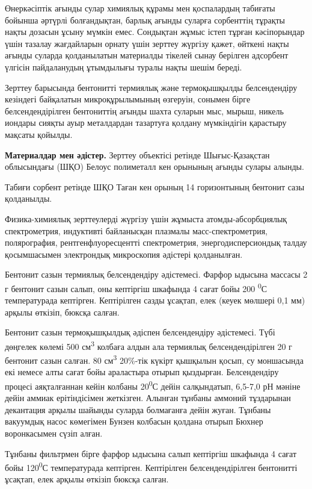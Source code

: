 Өнеркәсіптік ағынды сулар химиялық құрамы мен қоспалардың табиғаты
бойынша әртүрлі болғандықтан, барлық ағынды суларға сорбенттің тұрақты
нақты дозасын ұсыну мүмкін емес. Сондықтан жұмыс істеп тұрған
кәсіпорындар үшін тазалау жағдайларын орнату үшін зерттеу жүргізу қажет,
өйткені нақты ағынды суларда қолданылатын материалды тікелей сынау
берілген адсорбент үлгісін пайдаланудың ұтымдылығы туралы нақты шешім
береді.

Зерттеу барысында бентонитті термиялық және термоқышқылды белсендендіру
кезіндегі байқалатын микроқұрылымының өзгеруін, сонымен бірге
белсендендірілген бентониттің ағынды шахта суларын мыс, мырыш, никель
иондары сияқты ауыр металдардан тазартуға қолдану мүмкіндігін қарастыру
мақсаты қойылды.

\textbf{Материалдар мен әдістер.} Зерттеу объектісі ретінде
Шығыс-Қазақстан облысындағы (ШҚО) Белоус полиметалл кен орынының ағынды
сулары алынды.

Табиғи сорбент ретінде ШҚО Таған кен орының 14 горизонтының бентонит
сазы қолданылды.

Физика-химиялық зерттеулерді жүргізу үшін жұмыста атомды-абсорбциялық
спектрометрия, индуктивті байланысқан плазмалы масс-спектрометрия,
полярография, рентгенфлуоресцентті спектрометрия, энергодисперсиондық
талдау қосымшасымен электрондық микроскопия әдістері қолданылған.

Бентонит сазын термиялық белсендендіру әдістемесі. Фарфор ыдысына
массасы 2 г бентонит сазын салып, оны кептіргіш шкафында 4 сағат бойы
200 \textsuperscript{0}С температурада кептірген. Кептірілген сазды
ұсақтап, елек (кеуек мөлшері 0,1 мм) арқылы өткізіп, бюксқа салған.

Бентонит сазын термоқышқылдық әдіспен белсендендіру әдістемесі. Түбі
дөңгелек көлемі 500 см\textsuperscript{3} колбаға алдын ала термиялық
белсендендірілген 20 г бентонит сазын салған. 80 см\textsuperscript{3}
20\%-тік күкірт қышқылын қосып, су моншасында екі немесе алты сағат бойы
араластыра отырып қыздырған. Белсендендіру процесі аяқталғаннан кейін
колбаны 20\textsuperscript{0}С дейін салқындатып, 6,5-7,0 рН мәніне
дейін аммиак ерітіндісімен жеткізген. Алынған тұнбаны аммоний тұздарынан
декантация арқылы шайынды суларда болмағанға дейін жуған. Тұнбаны
вакуумдық насос көмегімен Бунзен колбасын қолдана отырып Бюхнер
воронкасымен сүзіп алған.

Тұнбаны фильтрмен бірге фарфор ыдысына салып кептіргіш шкафында 4 сағат
бойы 120\textsuperscript{0}С температурада кептірген. Кептірілген
белсендендірілген бентонитті ұсақтап, елек арқылы өткізіп бюксқа салған.

